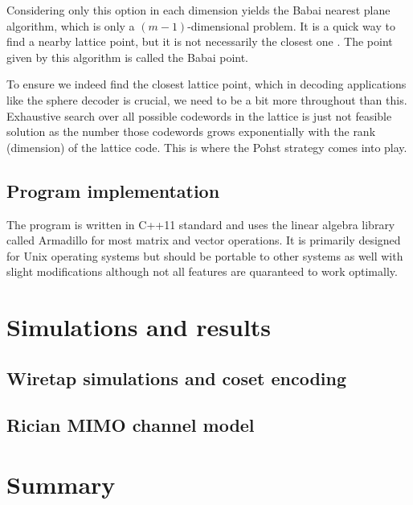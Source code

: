 \documentclass[english,12pt,a4paper,pdftex,sci,utf8]{aaltothesis}
\begin{document}
Considering only this option in each dimension yields the Babai nearest plane algorithm, which is only a $(m-1)$-dimensional problem. It is a quick way to find a nearby lattice point, but it is not necessarily the closest one \cite{agrell}. The point given by this algorithm is called the Babai point.
\par To ensure we indeed find the closest lattice point, which in decoding applications like the sphere decoder is crucial, we need to be a bit more throughout than this. Exhaustive search over all possible codewords in the lattice is just not feasible solution as the number those codewords grows exponentially with the rank (dimension) of the lattice code. This is where the Pohst strategy comes into play. 


\subsection{Program implementation}
The program is written in C++11 standard and uses the linear algebra library called Armadillo for most matrix and vector operations. It is primarily designed for Unix operating systems but should be portable to other systems as well with slight modifications although not all features are quaranteed to work optimally.

\clearpage

\section{Simulations and results}

\subsection{Wiretap simulations and coset encoding}
\subsection{Rician MIMO channel model}
 
\clearpage

\section{Summary}


\clearpage
\end{document}

